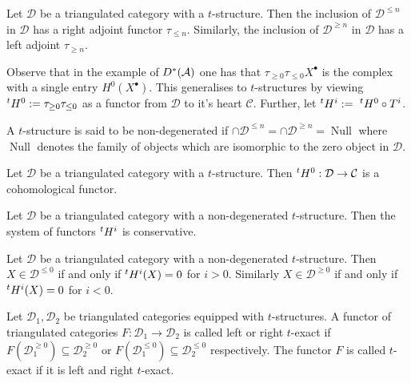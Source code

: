\begin{proposition}{\cite[Proposition 5.1.4.]{dimca2004sheaves}}
 Let $\mathcal{D}$ be a triangulated category with a $t$-structure.
 Then the inclusion of $\mathcal{D}^{\leq n}$ in $\mathcal{D}$ has a right adjoint functor $\tau_{\leq n}$.
 Similarly, the inclusion of $\mathcal{D}^{\geq n}$ in $\mathcal{D}$ has a left adjoint $\tau_{\geq n}$.
\end{proposition}
Observe that in the example of $D^*(\AA)$ one has that $\tau_{\geq 0} \tau_{\leq 0} X^\bullet$ is the complex with a single entry $H^0(X^\bullet)$.
This generalises to $t$-structures by viewing $\tH^0:= \tau_{\geq 0}\tau_{\leq 0}$ as a functor from $\mathcal{D}$ to it's heart $\mathcal{C}$.
Further, let $\tH^i:=\ \tH^0 \circ T^i$.
\begin{definition}
 A $t$-structure is said to be non-degenerated if $\cap \mathcal{D}^{\leq n} = \cap \mathcal{D}^{\geq n}= \operatorname{Null}$ where $\operatorname{Null}$ denotes the family of objects which are isomorphic to the zero object in $\mathcal{D}$.
\end{definition}
\begin{proposition}{\cite[Proposition 5.1.6.]{dimca2004sheaves}}
 Let $\mathcal{D}$ be a triangulated category with a $t$-structure. Then $\tH^0:\mathcal{D}\to \mathcal{C}$ is a cohomological functor.
\end{proposition}
\begin{proposition}{\cite[Proposition 5.1.7.]{dimca2004sheaves}}
 Let $\mathcal{D}$ be a triangulated category with a non-degenerated $t$-structure. Then the system of functors $\tH^i$ is conservative.
\end{proposition}
\begin{proposition}{\cite[Proposition 5.1.7.]{dimca2004sheaves}}\label{prop: tStructCohomD}
  Let $\mathcal{D}$ be a triangulated category with a non-degenerated $t$-structure.
  Then $X\in \mathcal{D}^{\leq 0}$ if and only if $\tH^i(X) = 0$ for $i>0$. Similarly $X\in \mathcal{D}^{\geq 0}$ if and only if $\tH^i(X)= 0$ for $i<0$.
\end{proposition}
\begin{definition}
 Let $\mathcal{D}_1,\mathcal{D}_2$ be triangulated categories equipped with $t$-structures. A functor of triangulated categories $F:\mathcal{D}_1\to \mathcal{D}_2$ is called left or right $t$-exact if $F(\mathcal{D}_1^{\geq 0}) \subseteq \mathcal{D}_2^{\geq 0}$ or $F(\mathcal{D}_1^{\leq 0}) \subseteq \mathcal{D}_2^{\leq 0}$ respectively.
 The functor $F$ is called $t$-exact if it is left and right $t$-exact.
\end{definition}
